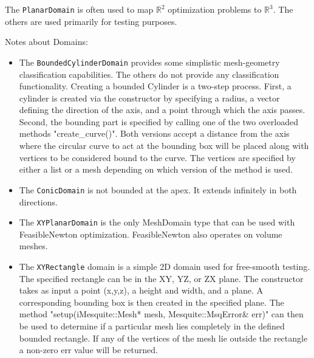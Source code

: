 The \texttt{PlanarDomain} is often used to map $\mathbb{R}^{2}$ optimization
problems to $\mathbb{R}^{3}$.  The others are used primarily for testing
purposes.  

\medskip
\noindent Notes about Domains:
\begin{itemize}
\item The \texttt{BoundedCylinderDomain} provides some simplistic mesh-geometry classification capabilities.  The others do not provide any classification functionality.  Creating a bounded Cylinder is a two-step process. First, a cylinder is created via the constructor by specifying a radius, a vector defining the direction of the axis, and a point through which the axis passes.  Second, the bounding part is specified by calling one of the two overloaded methods "create\_curve()".  Both versions accept a distance from the axis where the circular curve to act at the bounding box will be placed along with vertices to be considered bound to the curve.  The vertices are specified by either a list or a mesh depending on which version of the method is used.
\item The \texttt{ConicDomain} is not bounded at the apex.  It extends infinitely in  both directions.
\item The \texttt{XYPlanarDomain} is the only MeshDomain type that can be used with FeasibleNewton optimization.  FeasibleNewton also operates on volume meshes. 
\item The \texttt{XYRectangle} domain is a simple 2D domain used for free-smooth testing. The specified rectangle can be in the XY, YZ, or ZX plane.   The constructor takes as input a point (x,y,z), a height and width, and a plane.  A corresponding bounding box is then created in the specified plane. The method "setup(iMesquite::Mesh* mesh, Mesquite::MsqError\& err)" can then be used to determine if a particular mesh lies completely in the defined bounded rectangle. If any of the vertices of the mesh lie outside the rectangle a non-zero err value will be returned.
\end{itemize}
   
